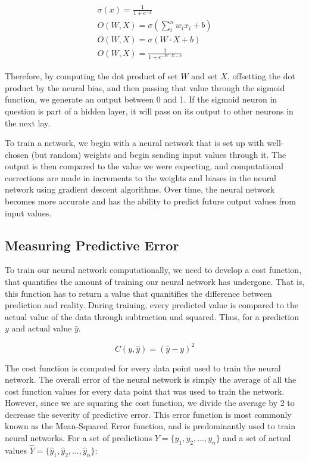 \begin{gather*}
    \sigma (x)=\frac{1}{1+e^{-x}}\\
    O(W, X)=\sigma \left(\sum_{i}^{n} w_{i}x_{i} + b\right)\\
    O(W, X)=\sigma \left(W\cdot X + b\right)\\
    O(W, X)=\frac{1}{1+e^{-W\cdot X - b}}
\end{gather*}

Therefore, by computing the dot product of set $W$ and set $X$, offsetting the dot product by the neural bias, and then passing that value through the sigmoid function, we generate an output between 0 and 1.
If the sigmoid neuron in question is part of a hidden layer, it will pass on its output to other neurons in the next lay. 

To train a network, we begin with a neural network that is set up with well-chosen (but random) weights and begin sending input values through it.
The output is then compared to the value we were expecting, and computational corrections are made in increments to the weights and biases in the neural network using gradient descent algorithms.
Over time, the neural network becomes more accurate and has the ability to predict future output values from input values.

\subsection{Measuring Predictive Error}

To train our neural network computationally, we need to develop a cost function, that quantifies the amount of training our neural network has undergone.
That is, this function has to return a value that quanitifies the difference between prediction and reality.
During training, every predicted value is compared to the actual value of the data through subtraction and squared.
Thus, for a prediction $y$ and actual value $\hat y$.

\begin{equation*}
C(y,\hat y)=(\hat y - y)^2
\end{equation*}

The cost function is computed for every data point used to train the neural network.
The overall error of the neural network is simply the average of all the cost function values for every data point that was used to train the network.
However, since we are squaring the cost function, we divide the average by 2 to decrease the severity of predictive error.
This error function is most commonly known as the Mean-Squared Error function, and is predominantly used to train neural networks.
For a set of predictions $Y=\{y_1,y_2,\hdots,y_n\}$ and a set of actual values $\hat Y=\{\hat y_1,\hat y_2,\hdots,\hat y_n\}$:

